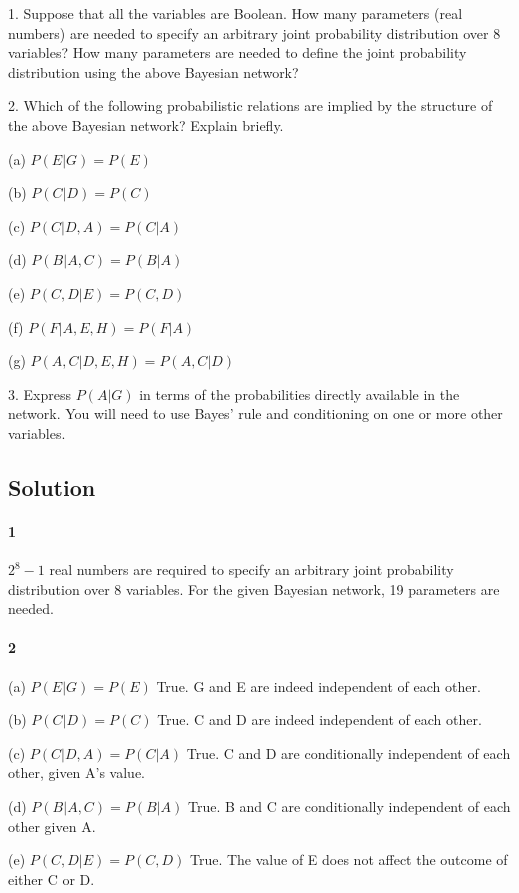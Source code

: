 \documentclass[10pt]{article}
\begin{document}
   1. Suppose that all the variables are Boolean. How many parameters (real numbers) are needed to specify an arbitrary joint probability distribution over 8 variables? How many parameters are needed to define the joint probability distribution using the above Bayesian network?

   2. Which of the following probabilistic relations are implied by the structure of the above Bayesian network? Explain briefly.

      (a)   	$P(E|G) = P(E)$

      (b)	$P(C|D) = P(C)$

      (c)	$P(C|D,A) = P(C|A)$

      (d)	$P(B|A,C) = P(B|A)$

      (e)	$P(C,D|E) = P(C,D)$

      (f)	$P(F|A,E,H) = P(F|A)$

      (g)	$P(A,C|D,E,H) = P(A,C|D)$

   3. Express $P(A|G)$ in terms of the probabilities directly available in the network. You will need to use Bayes' rule and conditioning on one or more other variables.

\subsection{Solution}

\paragraph{1} $2^{8}-1$ real numbers are required to specify an arbitrary joint probability distribution over 8 variables. For the given Bayesian network, 19 parameters are needed.

\paragraph{2}
      (a)   	$P(E|G) = P(E)$ True. G and E are indeed independent of each other.

      (b)	$P(C|D) = P(C)$ True. C and D are indeed independent of each other.

      (c)	$P(C|D,A) = P(C|A)$ True. C and D are conditionally independent of each other, given A's value.

      (d)	$P(B|A,C) = P(B|A)$ True. B and C are conditionally independent of each other given A.

      (e)	$P(C,D|E) = P(C,D)$ True. The value of E does not affect the outcome of either C or D.
\end{document}
